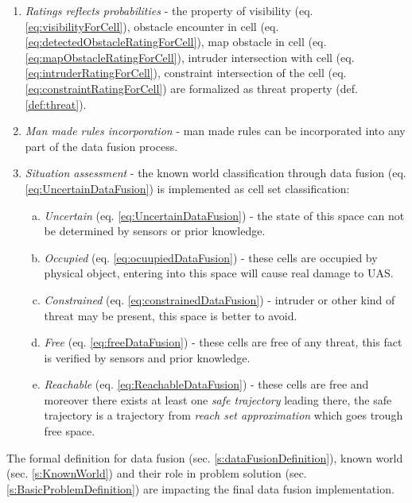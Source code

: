 \begin{enumerate}
        \item \emph{Ratings reflects probabilities} - the property of visibility (eq. \ref{eq:visibilityForCell}), obstacle encounter in cell (eq. \ref{eq:detectedObstacleRatingForCell}), map obstacle in cell (eq. \ref{eq:mapObstacleRatingForCell}), intruder intersection with cell (eq. \ref{eq:intruderRatingForCell}), constraint intersection of the cell (eq. \ref{eq:constraintRatingForCell}) are formalized as threat property (def. \ref{def:threat}). 
	    
	    \item \emph{Man made rules incorporation} - man made rules can be incorporated into any part of the data fusion process.
	    
	    \item \emph{Situation assessment} - the known world classification through data fusion (eq. \ref{eq:UncertainDataFusion}) is implemented as cell set classification:
	    \begin{enumerate}[a.]
	        \item \emph{Uncertain} (eq. \ref{eq:UncertainDataFusion}) - the state of this space can not be determined by sensors or prior knowledge.
	        
	        \item \emph{Occupied} (eq. \ref{eq:ocuupiedDataFusion}) -  these cells are occupied by physical object, entering into this space will cause real damage to UAS.
	        
 	        \item \emph{Constrained} (eq. \ref{eq:constrainedDataFusion}) - intruder or other kind of threat may be present, this space is better to avoid.
 	        
	        \item \emph{Free} (eq. \ref{eq:freeDataFusion}) - these cells are free of any threat, this fact is verified by sensors and prior knowledge.
	        
	        \item \emph{Reachable} (eq. \ref{eq:ReachableDataFusion}) - these cells are free and moreover there exists at least one \emph{safe trajectory} leading there, the safe trajectory is a trajectory from \emph{reach set approximation} which goes trough free space.
	    \end{enumerate}
\end{enumerate}	    

\begin{note}
    The formal definition for data fusion (sec. \ref{s:dataFusionDefinition}), known world (sec. \ref{s:KnownWorld}) and their role in problem solution (sec. \ref{s:BasicProblemDefinition}) are impacting the final data fusion implementation.
\end{note}
